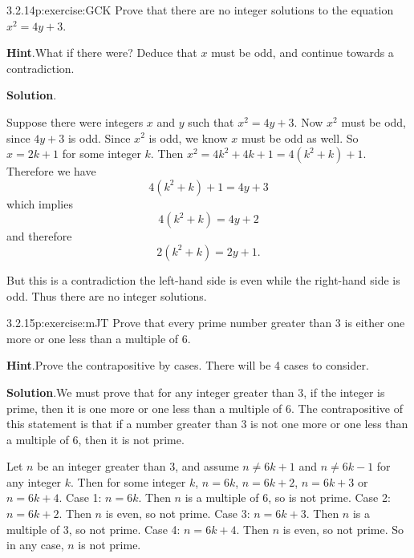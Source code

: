 \documentclass[twoside,11pt,]{book}
\newcommand{\blocktitlefont}{\relax}
\numberwithin{equation}{chapter}
\begin{document}
\begin{divisionsolution}{3.2.14}{}{p:exercise:GCK}%
Prove that there are no integer solutions to the equation \(x^2 = 4y + 3\).%
\par\smallskip%
\noindent\textbf{\blocktitlefont Hint}.\quad{}What if there were?  Deduce that \(x\) must be odd, and continue towards a contradiction.%
\par\smallskip%
\noindent\textbf{\blocktitlefont Solution}.\quad{}\begin{solutionproof}
Suppose there were integers \(x\) and \(y\) such that \(x^2 = 4y + 3\). Now \(x^2\) must be odd, since \(4y + 3\) is odd. Since \(x^2\) is odd, we know \(x\) must be odd as well. So \(x = 2k + 1\) for some integer \(k\). Then \(x^2 = 4k^2 + 4k + 1 = 4(k^2 + k) + 1\). Therefore we have%
\begin{equation*}
4(k^2 + k) + 1 = 4y + 3
\end{equation*}
which implies%
\begin{equation*}
4(k^2 + k) = 4y + 2
\end{equation*}
and therefore%
\begin{equation*}
2(k^2 + k) = 2y + 1\text{.}
\end{equation*}
%
\par
But this is a contradiction \textendash{} the left-hand side is even while the right-hand side is odd. Thus there are no integer solutions.%
\end{solutionproof}
\end{divisionsolution}%
\begin{divisionsolution}{3.2.15}{}{p:exercise:mJT}%
Prove that every prime number greater than 3 is either one more or one less than a multiple of 6.%
\par\smallskip%
\noindent\textbf{\blocktitlefont Hint}.\quad{}Prove the contrapositive by cases.  There will be 4 cases to consider.%
\par\smallskip%
\noindent\textbf{\blocktitlefont Solution}.\quad{}We must prove that for any integer greater than 3, if the integer is prime, then it is one more or one less than a multiple of 6. The contrapositive of this statement is that if a number greater than 3 is not one more or one less than a multiple of 6, then it is not prime.%
\begin{solutionproof}
Let \(n\) be an integer greater than 3, and assume \(n \ne 6k+1\) and \(n \ne 6k-1\) for any integer \(k\). Then for some integer \(k\), \(n = 6k\), \(n = 6k+2\), \(n = 6k+3\) or \(n = 6k+4\). Case 1: \(n = 6k\). Then \(n\) is a multiple of 6, so is not prime. Case 2: \(n = 6k+2\). Then \(n\) is even, so not prime. Case 3: \(n = 6k+3\). Then \(n\) is a multiple of 3, so not prime. Case 4: \(n = 6k+4\). Then \(n\) is even, so not prime. So in any case, \(n\) is not prime.%
\end{solutionproof}
\end{divisionsolution}%
\end{document}
